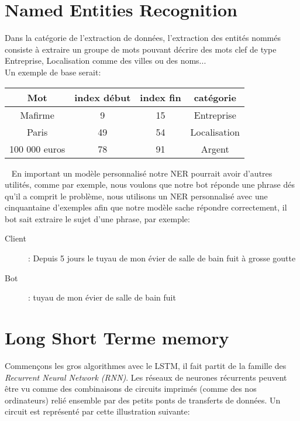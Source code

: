\pagebreak
\section{Named Entities Recognition}
Dans la catégorie de l'extraction de données, l'extraction des entités nommés consiste à extraire un groupe de mots pouvant décrire des mots clef de type Entreprise, Localisation comme des villes ou des noms...\\
Un exemple de base serait:\\


\begin{tabular}{c|cc|c}
Mot & index début & index fin & catégorie \\
\hline
Mafirme & 9 & 15 & Entreprise\\
Paris & 49 & 54 & Localisation\\
100 000 euros & 78 & 91 & Argent\\
\end{tabular}

\ \linebreak
En important un modèle personnalisé notre NER pourrait avoir d'autres utilités, comme par exemple, nous voulons que notre bot réponde une phrase dés qu'il a comprit le problème, nous utilisons un NER personnalisé avec une cinquantaine d'exemples afin que notre modèle sache répondre correctement, il bot sait extraire le sujet d'une phrase, par exemple:

\begin{description}
\item[Client]: Depuis 5 jours le tuyau de mon évier de salle de bain fuit à grosse goutte
\item[Bot]: tuyau de mon évier de salle de bain fuit
\end{description}

\pagebreak
\section{Long Short Terme memory}
Commençons les gros algorithmes avec le LSTM, il fait partit de la famille des \textit{Recurrent Neural Network (RNN)}. Les réseaux de neurones récurrents peuvent être vu comme des combinaisons de circuits imprimés (comme des nos ordinateurs) relié ensemble par des petits ponts de transferts de données. 
Un circuit est représenté par cette illustration suivante:

